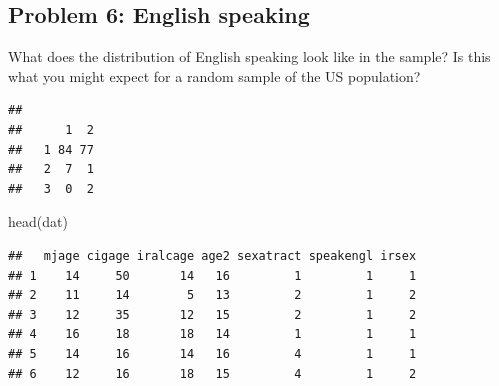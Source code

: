 \documentclass[
]{article}
\newenvironment{Shaded}{\begin{snugshade}}{\end{snugshade}}
\newcommand{\AttributeTok}[1]{\textcolor[rgb]{0.77,0.63,0.00}{#1}}
\newcommand{\CommentTok}[1]{\textcolor[rgb]{0.56,0.35,0.01}{\textit{#1}}}
\newcommand{\ConstantTok}[1]{\textcolor[rgb]{0.00,0.00,0.00}{#1}}
\newcommand{\FunctionTok}[1]{\textcolor[rgb]{0.00,0.00,0.00}{#1}}
\newcommand{\NormalTok}[1]{#1}
\newcommand{\OtherTok}[1]{\textcolor[rgb]{0.56,0.35,0.01}{#1}}
\newcommand{\SpecialCharTok}[1]{\textcolor[rgb]{0.00,0.00,0.00}{#1}}
\newcommand{\StringTok}[1]{\textcolor[rgb]{0.31,0.60,0.02}{#1}}
\begin{document}
\hypertarget{problem-6-english-speaking}{%
\subsection{Problem 6: English
speaking}\label{problem-6-english-speaking}}

What does the distribution of English speaking look like in the sample?
Is this what you might expect for a random sample of the US population?

\begin{Shaded}
\end{Shaded}

\begin{verbatim}
##    
##      1  2
##   1 84 77
##   2  7  1
##   3  0  2
\end{verbatim}

\begin{Shaded}
\begin{Highlighting}[]
\FunctionTok{head}\NormalTok{(dat)}
\end{Highlighting}
\end{Shaded}

\begin{verbatim}
##   mjage cigage iralcage age2 sexatract speakengl irsex
## 1    14     50       14   16         1         1     1
## 2    11     14        5   13         2         1     2
## 3    12     35       12   15         2         1     2
## 4    16     18       18   14         1         1     1
## 5    14     16       14   16         4         1     1
## 6    12     16       18   15         4         1     2
\end{verbatim}

\begin{Shaded}
\end{Shaded}
\end{document}
